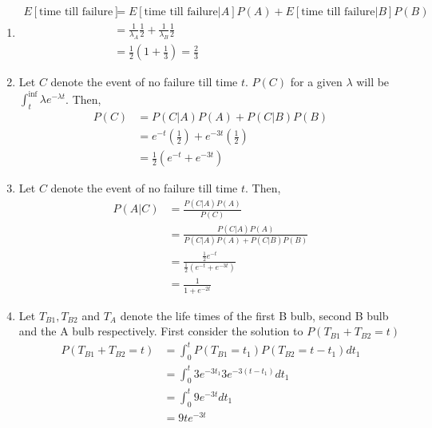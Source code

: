 \documentclass[../../probability-notes.tex]{subfiles}
\begin{document}
        \begin{enumerate}
            \item 
            \begin{align*}
                E[\text{time till failure}] &= E[\text{time till failure}|A]P(A) + E[\text{time till failure}|B]P(B)\\
                &= \frac{1}{\lambda_{A}} \frac{1}{2} + \frac{1}{\lambda_{B}} \frac{1}{2}\\
                &= \frac{1}{2}(1 + \frac{1}{3}) = \frac{2}{3}
            \end{align*}

            \item Let $C$ denote the event of no failure till time $t$. $P(C)$ for a given $\lambda$ will be $\int_{t}^{\inf} \lambda e^{-\lambda t}$. Then,
            \begin{align*}
                P(C) &= P(C|A)P(A) + P(C|B)P(B) \tag*{Using total probability theorem}\\
                     &= e^{-t}(\frac{1}{2}) + e^{-3t}(\frac{1}{2})\\
                     &= \frac{1}{2}(e^{-t} + e^{-3t})
            \end{align*}

            \item \label{itm:a_poissonbulb2_c} Let $C$ denote the event of no failure till time $t$. Then,
            \begin{align*}
                P(A|C) &= \frac{P(C|A)P(A)}{P(C)}\\
                       &= \frac{P(C|A)P(A)}{P(C|A)P(A) + P(C|B)P(B)}\\
                       &= \frac{\frac{1}{2} e^{-t}}{\frac{1}{2}(e^{-t} + e^{-3t})}\\
                       &= \frac{1}{1 + e^{-2t}}
            \end{align*}

            \item Let $T_{B1}, T_{B2}$ and $T_{A}$ denote the life times of the first B bulb, second B bulb and the A bulb respectively. First consider the solution to $P(T_{B1} + T_{B2} = t)$
            \begin{align*}
                P(T_{B1} + T_{B2} = t) &= \int_{0}^{t} P(T_{B1} = t_{1})P(T_{B2} = t - t_{1}) dt_{1} \tag*{Using independence}\\
                &= \int_{0}^{t} 3e^{-3t_{1}} 3e^{-3(t - t_{1})} dt_{1}\\
                &= \int_{0}^{t} 9e^{-3t}dt_{1}\\
                &= 9te^{-3t}
            \end{align*}
            

\end{enumerate}
\end{document}
